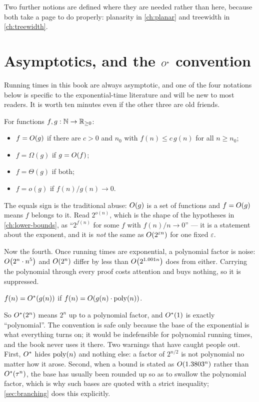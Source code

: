 Two further notions are defined where they are needed rather than here, because
both take a page to do properly: planarity in \cref{ch:planar} and treewidth in
\cref{ch:treewidth}.

\section{Asymptotics, and the \texorpdfstring{$O^{*}$}{O*} convention}
\label{sec:prelim-asymptotics}

Running times in this book are always asymptotic, and one of the four notations
below is specific to the exponential-time literature and will be new to most
readers. It is worth ten minutes even if the other three are old friends.

For functions $f, g : \mathbb{N} \to \mathbb{R}_{\ge 0}$:
\begin{itemize}[leftmargin=*,nosep]
  \item $f = O\!\left(g\right)$ if there are $c > 0$ and $n_0$ with
        $f(n) \le c\,g(n)$ for all $n \ge n_0$;
  \item $f = \Omega(g)$ if $g = O\!\left(f\right)$;
  \item $f = \Theta(g)$ if both;
  \item $f = o(g)$ if $f(n)/g(n) \to 0$.
\end{itemize}
The equals sign is the traditional abuse: $O\!\left(g\right)$ is a set of functions and
$f = O\!\left(g\right)$ means $f$ belongs to it. Read $2^{o(n)}$, which is the shape of
the hypotheses in \cref{ch:lower-bounds}, as ``$2^{f(n)}$ for some $f$ with
$f(n)/n \to 0$'' --- it is a statement about the exponent, and it is
\emph{not} the same as $O\!\left(2^{\varepsilon n}\right)$ for one fixed $\varepsilon$.

Now the fourth. Once running times are exponential, a polynomial factor is
noise: $O\!\left(2^n \cdot n^{5}\right)$ and $O\!\left(2^n\right)$ differ by less than
$O\!\left(2^{1.001n}\right)$ does from either. Carrying the polynomial through every
proof costs attention and buys nothing, so it is suppressed.

\begin{definition}\label{def:prelim-ostar}
$f(n) = O^{*}(g(n))$ if $f(n) = O\!\left(g(n) \cdot \mathrm{poly}(n)\right)$.
\end{definition}

So $O^{*}(2^n)$ means $2^n$ up to a polynomial factor, and $O^{*}(1)$ is
exactly ``polynomial''. The convention is safe only because the base of the
exponential is what everything turns on; it would be indefensible for
polynomial running times, and the book never uses it there. Two warnings that
have caught people out. First, $O^{*}$ hides $\mathrm{poly}(n)$ and nothing else: a
factor of $2^{n/2}$ is not polynomial no matter how it arose. Second, when a
bound is stated as $O\!\left(1.3803^n\right)$ rather than $O^{*}(\tau^n)$, the base has
usually been rounded up so as to swallow the polynomial factor, which is why
such bases are quoted with a strict inequality; \cref{sec:branching}
does this explicitly.

